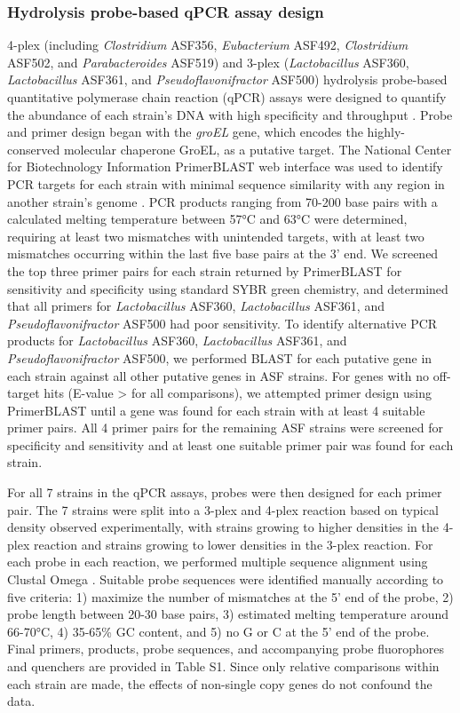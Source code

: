 \documentclass[11pt,onecolumn,notitlepage,openany,twoside]{book}
\begin{document}
\begin{refsection}
\subsubsection{Hydrolysis probe-based qPCR assay design}
4-plex (including \textit{Clostridium} ASF356, \textit{Eubacterium} ASF492, \textit{Clostridium} ASF502, and \textit{Parabacteroides} ASF519) and 3-plex (\textit{Lactobacillus} ASF360, \textit{Lactobacillus} ASF361, and \textit{Pseudoflavonifractor} ASF500) hydrolysis probe-based quantitative polymerase chain reaction (qPCR) assays were designed to quantify the abundance of each strain’s DNA with high specificity and throughput \cite{Holland1991-gw}. Probe and primer design began with the \textit{groEL} gene, which encodes the highly-conserved molecular chaperone GroEL, as a putative target. The National Center for Biotechnology Information PrimerBLAST web interface was used to identify PCR targets for each strain with minimal sequence similarity with any region in another strain’s genome \cite{Ye2012-eb}. PCR products ranging from 70-200 base pairs with a calculated melting temperature between 57°C and 63°C were determined, requiring at least two mismatches with unintended targets, with at least two mismatches occurring within the last five base pairs at the 3’ end. We screened the top three primer pairs for each strain returned by PrimerBLAST for sensitivity and specificity using standard SYBR green chemistry, and determined that all primers for \textit{Lactobacillus} ASF360, \textit{Lactobacillus} ASF361, and \textit{Pseudoflavonifractor} ASF500 had poor sensitivity. To identify alternative PCR products for \textit{Lactobacillus} ASF360, \textit{Lactobacillus} ASF361, and \textit{Pseudoflavonifractor} ASF500, we performed BLAST for each putative gene in each strain against all other putative genes in ASF strains. For genes with no off-target hits (E-value \textgreater{} for all comparisons), we attempted primer design using PrimerBLAST until a gene was found for each strain with at least 4 suitable primer pairs. All 4 primer pairs for the remaining ASF strains were screened for specificity and sensitivity and at least one suitable primer pair was found for each strain.

For all 7 strains in the qPCR assays, probes were then designed for each primer pair. The 7 strains were split into a 3-plex and 4-plex reaction based on typical density observed experimentally, with strains growing to higher densities in the 4-plex reaction and strains growing to lower densities in the 3-plex reaction. For each probe in each reaction, we performed multiple sequence alignment using Clustal Omega \cite{Sievers2011-bk}. Suitable probe sequences were identified manually according to five criteria: 1) maximize the number of mismatches at the 5’ end of the probe, 2) probe length between 20-30 base pairs, 3) estimated melting temperature around 66-70°C, 4) 35-65\% GC content, and 5) no G or C at the 5’ end of the probe. Final primers, products, probe sequences, and accompanying probe fluorophores and quenchers are provided in Table S1. Since only relative comparisons within each strain are made, the effects of non-single copy genes do not confound the data.


\end{refsection}
\end{document}
